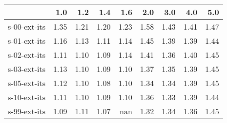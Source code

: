 \begin{tabular}{lrrrrrrrr}
\toprule
{} &  1.0 &  1.2 &  1.4 &  1.6 &  2.0 &  3.0 &  4.0 &  5.0 \\
\midrule
s-00-ext-its & 1.35 & 1.21 & 1.20 & 1.23 & 1.58 & 1.43 & 1.41 & 1.47 \\
s-01-ext-its & 1.16 & 1.13 & 1.11 & 1.14 & 1.45 & 1.39 & 1.39 & 1.44 \\
s-02-ext-its & 1.11 & 1.10 & 1.09 & 1.14 & 1.41 & 1.36 & 1.40 & 1.45 \\
s-03-ext-its & 1.13 & 1.10 & 1.09 & 1.10 & 1.37 & 1.35 & 1.39 & 1.45 \\
s-05-ext-its & 1.12 & 1.10 & 1.08 & 1.10 & 1.34 & 1.34 & 1.39 & 1.45 \\
s-10-ext-its & 1.11 & 1.10 & 1.09 & 1.10 & 1.36 & 1.33 & 1.39 & 1.44 \\
s-99-ext-its & 1.09 & 1.11 & 1.07 &  nan & 1.32 & 1.34 & 1.36 & 1.45 \\
\bottomrule
\end{tabular}
